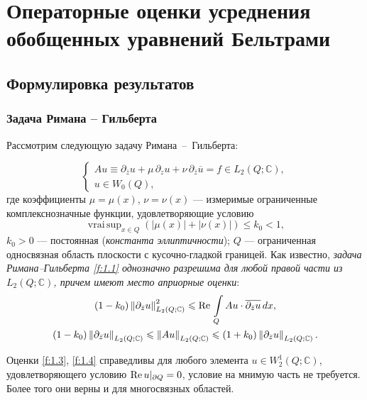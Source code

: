 \chapter{Операторные оценки усреднения  обобщенных уравнений  Бельтрами}

\section{Формулировка результатов}


\subsection{Задача Римана -- Гильберта}\label{par1.1}


Рассмотрим следующую задачу Римана~--~Гильберта:

\begin{equation}\label{f:1.1}
   \left\{\begin{array}{l}
A u\equiv\partial_{\bar{z}}u+\mu\,\partial_z u+\nu\,\partial_{\bar z}\overline{u}=f\in L_2(Q;\mathbb{C}), \\[3mm]
   u\in W_0(Q),
\end{array}\right.
\end{equation}
где коэффициенты $\mu=\mu(x)$, $\nu=\nu(x)$ --- измеримые ограниченные комплекснозначные функции, удовлетворяющие условию
\begin{equation}\label{f:1.2}
   \mathop{\mathrm {vrai\,sup}}_{x\in Q}\left(|\mu(x)|+|\nu(x)|\right)\leqslant k_0 <1,
\end{equation}
 $k_0>0$ --- постоянная (\textit{константа эллиптичности}); $Q$ --- ограниченная
  односвязная область плоскости с кусочно-гладкой границей. Как известно,
\textit{
задача Римана--Гильберта \eqref{f:1.1} однозначно разрешима для любой правой части из $L_2(Q;\mathbb{C})$,
причем имеют место априорные оценки}:
\begin{gather}\label{f:1.3}
   (1-k_0)\left\|\partial_{\bar{z}}u\right\|^2_{L_2(Q;\mathbb{C})}\leqslant \text{Re\,} \int\limits_{Q} Au\cdot \overline{\partial_{\bar{z}}u}\,dx,\\
\label{f:1.4}
  (1-k_0)\left\|\partial_{\bar{z}}u\right\|_{L_2(Q;\mathbb{C})}\leqslant \left\| Au\right\|_{L_2(Q;\mathbb{C})} \leqslant
   (1+k_0)\left\|\partial_{\bar{z}}u\right\|_{L_2(Q;\mathbb{C})}.
\end{gather}


Оценки \eqref{f:1.3}, \eqref{f:1.4} справедливы для любого элемента $u\in W_2^1(Q;\mathbb{C})$, удовлетворяющего условию
$\text{Re\,}u|_{\partial Q}=0$, условие на мнимую часть не требуется.
Более того они верны и для многосвязных областей.

